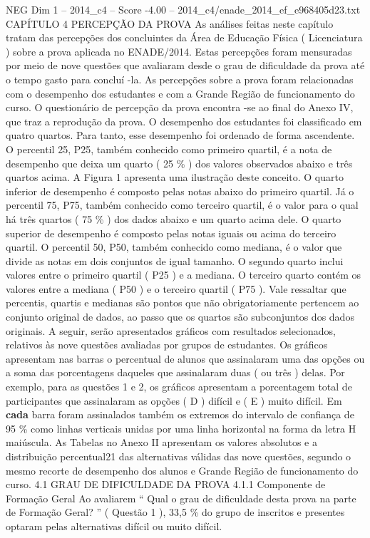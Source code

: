 \begin{textsample}{NEG Dim 1 – 2014\_c4 – Score -4.00 – 2014\_c4/enade\_2014\_ef\_e968405d23.txt}  \label{ex:f1_neg_130}
CAPÍTULO 4 PERCEPÇÃO DA PROVA As análises feitas neste capítulo tratam das percepções dos concluintes da Área de Educação Física ( Licenciatura ) sobre a prova aplicada no ENADE/2014.
Estas percepções foram mensuradas por meio de nove questões que avaliaram desde o grau de dificuldade da prova até o tempo gasto para concluí -la.
As percepções sobre a prova foram relacionadas com o desempenho dos estudantes e com a Grande Região de funcionamento do curso.
O questionário de percepção da prova encontra -se ao final do Anexo IV, que traz a reprodução da prova.
O desempenho dos estudantes foi classificado em quatro quartos.
Para tanto, esse desempenho foi ordenado de forma ascendente.
O percentil 25, P25, também conhecido como primeiro quartil, é a nota de desempenho que deixa um quarto ( 25 \% ) dos valores observados abaixo e três quartos acima.
A Figura 1 apresenta uma ilustração deste conceito.
O quarto inferior de desempenho é composto pelas notas abaixo do primeiro quartil.
Já o percentil 75, P75, também conhecido como terceiro quartil, é o valor para o qual há três quartos ( 75 \% ) dos dados abaixo e um quarto acima dele.
O quarto superior de desempenho é composto pelas notas iguais ou acima do terceiro quartil.
O percentil 50, P50, também conhecido como mediana, é o valor que divide as notas em dois conjuntos de igual tamanho.
O segundo quarto inclui valores entre o primeiro quartil ( P25 ) e a mediana.
O terceiro quarto contém os valores entre a mediana ( P50 ) e o terceiro quartil ( P75 ).
Vale ressaltar que percentis, quartis e medianas são pontos que não obrigatoriamente pertencem ao conjunto original de dados, ao passo que os quartos são subconjuntos dos dados originais.
A seguir, serão apresentados gráficos com resultados selecionados, relativos às nove questões avaliadas por grupos de estudantes.
Os gráficos apresentam nas barras o percentual de alunos que assinalaram uma das opções ou a soma das porcentagens daqueles que assinalaram duas ( ou três ) delas.
Por exemplo, para as questões 1 e 2, os gráficos apresentam a porcentagem total de participantes que assinalaram as opções ( D ) difícil e ( E ) muito difícil.
Em \textbf{cada} barra foram assinalados também os extremos do intervalo de confiança de 95 \% como linhas verticais unidas por uma linha horizontal na forma da letra H maiúscula.
As Tabelas no Anexo II apresentam os valores absolutos e a distribuição percentual21 das alternativas válidas das nove questões, segundo o mesmo recorte de desempenho dos alunos e Grande Região de funcionamento do curso. 4.1 GRAU DE DIFICULDADE DA PROVA 4.1.1 Componente de Formação Geral Ao avaliarem “ Qual o grau de dificuldade desta prova na parte de Formação Geral? ” ( Questão 1 ), 33,5 \% do grupo de inscritos e presentes optaram pelas alternativas difícil ou muito difícil.

\end{textsample}
